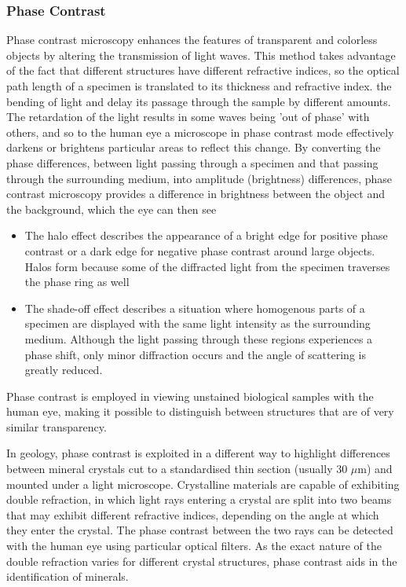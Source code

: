 \documentclass{article}
\begin{document}
\subsubsection{Phase Contrast}

Phase contrast microscopy enhances the features of transparent and colorless objects by altering the transmission of light waves. This method takes advantage of the fact that different structures have different refractive indices, so the optical path length of a specimen is translated to its thickness and refractive index.  the bending of light and delay its passage through the sample by different amounts. The retardation of the light results in some waves being 'out of phase' with others, and so to the human eye a microscope in phase contrast mode effectively darkens or brightens particular areas to reflect this change. 
 By converting the phase differences, between light passing through a specimen and that passing through the surrounding medium, into amplitude (brightness) differences, phase contrast microscopy provides a difference in brightness between the object and the background, which the eye can then see
  \begin{itemize}
  \item The halo effect describes the appearance of a bright edge for positive phase contrast or a dark edge for negative phase contrast around large objects. Halos form because some of the diffracted light from the specimen traverses the phase ring as well
  \item The shade-off effect describes a situation where homogenous parts of a specimen are displayed with the same light intensity as the surrounding medium. Although the light passing through these regions experiences a phase shift, only minor diffraction occurs and the angle of scattering is greatly reduced. 
\end{itemize}
Phase contrast is employed in viewing unstained biological samples with the human eye, making it possible to distinguish between structures that are of very similar transparency.

In geology, phase contrast is exploited in a different way to highlight differences between mineral crystals cut to a standardised thin section (usually 30 $\mu$m) and mounted under a light microscope. Crystalline materials are capable of exhibiting double refraction, in which light rays entering a crystal are split into two beams that may exhibit different refractive indices, depending on the angle at which they enter the crystal. The phase contrast between the two rays can be detected with the human eye using particular optical filters. As the exact nature of the double refraction varies for different crystal structures, phase contrast aids in the identification of minerals.
\end{document}
